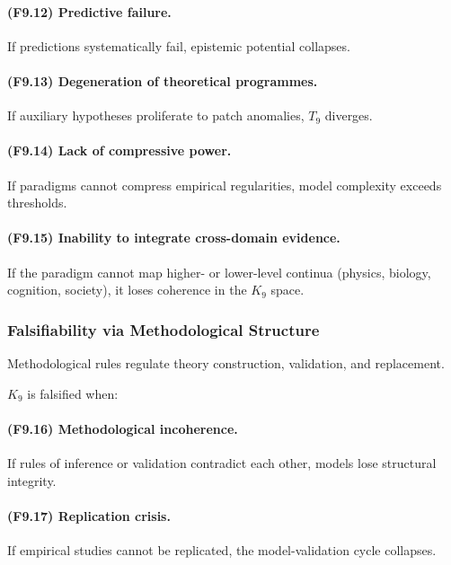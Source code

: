 \paragraph{(F9.12) Predictive failure.}
If predictions systematically fail,
epistemic potential collapses.

\paragraph{(F9.13) Degeneration of theoretical programmes.}
If auxiliary hypotheses proliferate to patch anomalies,
$T_9$ diverges.

\paragraph{(F9.14) Lack of compressive power.}
If paradigms cannot compress empirical regularities,
model complexity exceeds thresholds.

\paragraph{(F9.15) Inability to integrate cross-domain evidence.}
If the paradigm cannot map higher- or lower-level continua
(physics, biology, cognition, society),
it loses coherence in the $K_9$ space.



\subsubsection{Falsifiability via Methodological Structure}

Methodological rules regulate theory construction, validation,
and replacement.

$K_9$ is falsified when:

\paragraph{(F9.16) Methodological incoherence.}
If rules of inference or validation contradict each other,
models lose structural integrity.

\paragraph{(F9.17) Replication crisis.}
If empirical studies cannot be replicated,
the model-validation cycle collapses.

